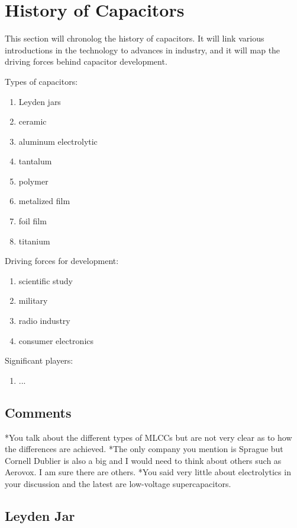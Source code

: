 \section {History of Capacitors}
This section will chronolog the history of capacitors. It will link various introductions in the technology to advances in industry, and it will map the driving forces behind capacitor development.

\noindent Types of capacitors:
\begin{enumerate}
    \item Leyden jars
    \item ceramic 
    \item aluminum electrolytic 
    \item tantalum 
    \item polymer
    \item metalized film
    \item foil film
    \item titanium 
\end {enumerate}

\noindent Driving forces for development:
\begin {enumerate}
    \item scientific study
    \item military
    \item radio industry
    \item consumer electronics
\end {enumerate}

\noindent Significant players:
\begin{enumerate}
    \item ...
\end {enumerate}

\subsection{Comments}
*You talk about the different types of MLCCs but are not very clear as to how the differences are achieved.
*The only company you mention is Sprague but Cornell Dublier is also a big and I would need to think about others such as Aerovox.  I am sure there are others.
*You said very little about electrolytics in your discussion and the latest are low-voltage supercapacitors.

\subsection{Leyden Jar}


